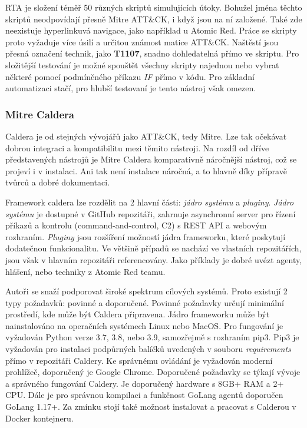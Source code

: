 \ac{RTA} je složení téměř 50 různých skriptů simulujících útoky.
Bohužel jména těchto skriptů neodpovídají přesně Mitre ATT\&CK, i když jsou na ní založené.
Také zde neexistuje hyperlinkuvá navigace, jako například u Atomic Red.
Práce se skripty proto vyžaduje více úsilí a určitou známost matice ATT\&CK\@.
Naštěstí jsou přesná označení technik, jako \textbf{T1107}, snadno dohledatelná přímo ve skriptu.
Pro složitější testování je možné spouštět všechny skripty najednou nebo vybrat některé pomocí podmíněného příkazu \textit{IF} přímo v kódu.
Pro základní automatizaci stačí, pro hlubší testovaní je tento nástroj však omezen.\cite{csoonline_4_testing_frameworks}


\subsubsection{Mitre Caldera}
Caldera je od stejných vývojářů jako ATT\&CK, tedy Mitre.
Lze tak očekávat dobrou integraci a kompatibilitu mezi těmito nástroji.
Na rozdíl od dříve představených nástrojů je Mitre Caldera komparativně náročnější nástroj, což se projeví i v instalaci.
Ani tak není instalace náročná, a to hlavně díky přípravě tvůrců a dobré dokumentaci\cite{mitre_caldera_docs}.

Framework caldera lze rozdělit na 2 hlavní části: \textit{jádro systému} a \textit{pluginy}.
\textit{Jádro systému} je dostupné v GitHub repozitáři, zahrnuje asynchronní server pro řízení příkazů a kontrolu (command-and-control, C2) s REST API a webovým rozhraním.
\textit{Pluginy} jsou rozšíření možností jádra frameworku, které poskytují dodatečnou funkcionalitu.
Ve většině případů se nachází ve vlastních repozitářích, jsou však v hlavním repozitáři referencovány.
Jako příklady je dobré uvézt agenty, hlášení, nebo  techniky z Atomic Red teamu.\cite{mitre_caldera}

Autoři se snaží podporovat široké spektrum cílových systémů.
Proto existují 2 typy požadavků: povinné a doporučené.
Povinné požadavky určují minimální prostředí, kde může být Caldera připravena.
Jádro frameworku může být nainstalováno na operačních systémech Linux nebo MacOS\@.
Pro fungování je vyžadován Python verze 3.7, 3.8, nebo 3.9, samozřejmě s rozhraním pip3.
Pip3 je vyžadován pro instalaci podpůrných balíčků uvedených v souboru \textit{requirements} přímo v repozitáři Caldery.
Ke správnému ovládání je vyžadován moderní prohlížeč, doporučený je Google Chrome.
Doporučené požadavky se týkají vývoje a správného fungování Caldery.
Je doporučený hardware s 8GB+ RAM a 2+ CPU\@.
Dále je pro správnou kompilaci a funkčnost GoLang agentů doporučen GoLang 1.17+.
Za zmínku stojí také možnost instalovat a pracovat s Calderou v Docker kontejneru.\cite{mitre_caldera_docs}

